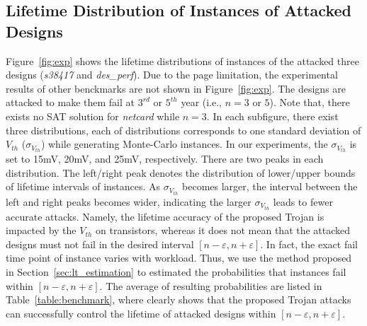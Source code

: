 \subsection{Lifetime Distribution of Instances of Attacked Designs}
\label{sec:exp:exp}
Figure~\ref{fig:exp} shows the lifetime distributions of instances of the attacked three designs (\textit{s38417} and \textit{des\_perf}). Due to the page limitation, the experimental results of other benckmarks are not shown in Figure~\ref{fig:exp}. The designs are attacked to make them fail at $3^{rd}$ or $5^{th}$ year (i.e., $n = 3$ or $5$). Note that, there exists no SAT solution for \textit{netcard} while $n = 3$. %
In each subfigure, there exist three distributions, each of distributions corresponds to one standard deviation of $V_{th}$ ($\sigma_{V_{th}}$) while generating Monte-Carlo instances. In our experiments, the $\sigma_{V_{th}}$ is set to 15mV, 20mV, and 25mV, respectively. There are two peaks in each distribution. The left/right peak denotes the distribution of lower/upper bounds of lifetime intervals of instances. %
As $\sigma_{V_{th}}$ becomes larger, the interval between the left and right peaks becomes wider, indicating the larger $\sigma_{V_{th}}$ leads to fewer accurate attacks. Namely, the lifetime accuracy of the proposed Trojan is impacted by the $V_{th}$ on transistors, whereas it does not mean that the attacked designs must not fail in the desired interval $[n-\varepsilon,n+\varepsilon]$. In fact, the exact fail time point of instance varies with workload.  Thus, we use the method proposed in Section~\ref{sec:lt_estimation} to estimated the probabilities that instances fail within $[n-\varepsilon,n+\varepsilon]$. The average of resulting probabilities are listed in Table~\ref{table:benchmark}, where clearly shows that the proposed Trojan attacks can successfully control the lifetime of attacked designs within $[n-\varepsilon,n+\varepsilon]$.%

